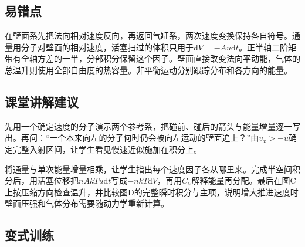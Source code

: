 \documentclass[UTF8,fontset=fandol,a4paper,11pt]{ctexart}
\begin{document}


\subsection*{易错点}

在壁面系先把法向相对速度反向，再返回气缸系，两次速度变换保持各自符号。通量用分子对壁面的相对速度，活塞扫过的体积只用于$\mathrm dV=-Au\mathrm dt$。正半轴二阶矩带有全轴方差的一半，分部积分保留这个因子。壁面直接改变法向平动能，气体的总温升则使用全部自由度的热容量。非平衡运动分别跟踪分布和各方向的能量。



\subsection*{课堂讲解建议}

先用一个确定速度的分子演示两个参考系，把碰前、碰后的箭头与能量增量逐一写出。再问：“一个本来向左的分子何时仍会被向左运动的壁面追上？”由$v_x>-u$确定完整入射区间，让学生看见慢速近似施加在积分上。

将通量与单次能量增量相乘，让学生指出每个速度因子各从哪里来。完成半空间积分后，用活塞位移把$nAkTu\mathrm dt$写成$-nkT\mathrm dV$，再用$C_V$解释能量再分配。最后在图C上按压缩方向检查温升，并比较图D的完整瞬时积分与主项，说明增大推进速度时壁面压强和气体分布需要随动力学重新计算。



\subsection*{变式训练}
\end{document}
